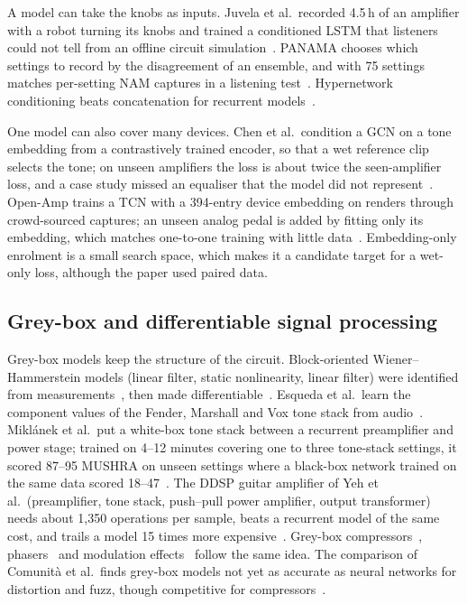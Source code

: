 A model can take the knobs as inputs. Juvela et al.\ recorded 4.5\,h of an
amplifier with a robot turning its knobs and trained a conditioned LSTM that
listeners could not tell from an offline circuit simulation~\cite{juvela2023endtoend}.
PANAMA chooses which settings to record by the disagreement of an ensemble,
and with 75 settings matches per-setting NAM captures in a listening
test~\cite{grotschla2025parametric}. Hypernetwork conditioning beats
concatenation for recurrent models~\cite{yeh2024hyper}.

One model can also cover many devices. Chen et al.\ condition a GCN on a
tone embedding from a contrastively trained encoder, so that a wet reference
clip selects the tone; on unseen amplifiers the loss is about twice the
seen-amplifier loss, and a case study missed an equaliser that the model did
not represent~\cite{chen2024zeroshot,chen2024demo}. Open-Amp trains a TCN with
a 394-entry device embedding on renders through crowd-sourced captures; an
unseen analog pedal is added by fitting only its embedding, which matches
one-to-one training with little data~\cite{wright2025openamp}. Embedding-only
enrolment is a small search space, which makes it a candidate target for a
wet-only loss, although the paper used paired data.

\subsection{Grey-box and differentiable signal processing}

Grey-box models keep the structure of the circuit. Block-oriented
Wiener--Hammerstein models (linear filter, static nonlinearity, linear filter)
were identified from measurements~\cite{eichas2017block,eichas2018graybox},
then made differentiable~\cite{kuznetsov2020differentiable,colonel2022waveshapers}.
Esqueda et al.\ learn the component values of the Fender, Marshall and Vox
tone stack from audio~\cite{esqueda2021differentiable}. Miklánek et al.\ put a
white-box tone stack between a recurrent preamplifier and power stage; trained
on 4--12 minutes covering one to three tone-stack settings, it scored 87--95
MUSHRA on unseen settings where a black-box network trained on the same data
scored 18--47~\cite{miklanek2023neural}. The DDSP guitar amplifier of Yeh et
al.\ (preamplifier, tone stack, push--pull power amplifier, output
transformer) needs about 1,350 operations per sample, beats a recurrent model
of the same cost, and trails a model 15 times more
expensive~\cite{yeh2025ddsp}. Grey-box compressors~\cite{wright2022greybox},
phasers~\cite{carson2023differentiable} and modulation
effects~\cite{carson2026gradient} follow the same idea. The comparison of
Comunità et al.\ finds grey-box models not yet as accurate as neural networks
for distortion and fuzz, though competitive for
compressors~\cite{comunita2025differentiable}.

